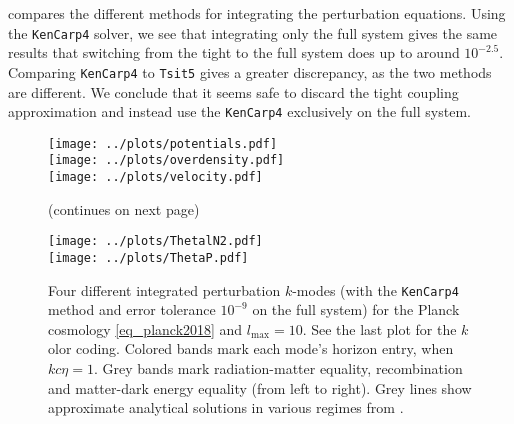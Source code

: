 \documentclass[10pt,a4paper]{article}
\begin{document}
 compares the different methods for integrating the perturbation equations.
Using the \texttt{KenCarp4} solver, we see that integrating only the full system
gives the same results that switching from the tight to the full system does up to around $10^{-2.5}$.
Comparing \texttt{KenCarp4} to \texttt{Tsit5} gives a greater discrepancy, as the two methods are different.
We conclude that it seems safe to discard the tight coupling approximation and instead use the \texttt{KenCarp4} exclusively on the full system.

\begin{figure}[ht!]
\iffalse
\begin{minipage}{0.49\textwidth}
\texttt{[image: ../plots/overdensity.pdf]} \\
\texttt{[image: ../plots/ThetalN2.pdf]} \\
\texttt{[image: ../plots/potentials.pdf]} \\
\end{minipage}
\hfill
\begin{minipage}{0.49\textwidth}
\texttt{[image: ../plots/velocity.pdf]} \\
\texttt{[image: ../plots/ThetaP.pdf]} \\
\phantom{\texttt{[image: ../plots/ThetaP.pdf]}} \\ %
\end{minipage}
\fi
\centering
\texttt{[image: ../plots/potentials.pdf]} \\
\texttt{[image: ../plots/overdensity.pdf]} \\
\texttt{[image: ../plots/velocity.pdf]} \\
\caption{(continues on next page)}
\end{figure}
\begin{figure}[ht!]\ContinuedFloat
\centering
\texttt{[image: ../plots/ThetalN2.pdf]} \\
\texttt{[image: ../plots/ThetaP.pdf]} \\
\caption{%
	Four different integrated perturbation $k$-modes (with the \texttt{KenCarp4} method and error tolerance $10^{-9}$ on the full system) for the Planck cosmology \eqref{eq_planck2018} and $l_\text{max}=10$.
	See the last plot for the $k$olor coding.
	Colored bands mark each mode's horizon entry, when $k c \eta = 1$.
	Grey bands mark radiation-matter equality, recombination and matter-dark energy equality (from left to right).
	Grey lines show approximate analytical solutions in various regimes from \cite[equations (8.22), (8.31), (8.46), (8.52) and (8.64)]{dodelsonModernCosmology2021}.
}
\label{fig_perturb_all}
\end{figure}%
\end{document}
